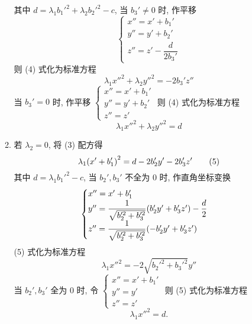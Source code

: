 \begin{enumerate}[label=(\arabic{*})]
\begin{enumerate}[label=(\roman{*})]
                    其中 $d=\lambda_1b_1'^2+\lambda_2b_2'^2-c$, 当 $b_3'\neq0$ 时, 作平移 $$\begin{cases}
                            x''=x'+b_1' \\
                            y''=y'+b_2' \\
                            z''=z'-\dfrac{d}{2b_3'}
                        \end{cases}$$ 则 (4) 式化为标准方程 $$\lambda_1x''^2+\lambda_2y''^2=-2b_3'z''$$
                    当 $b_3'=0$ 时, 作平移 $\begin{cases}
                            x''=x'+b_1' \\
                            y''=y'+b_2' \\
                            z''=z'
                        \end{cases}$ 则 (4) 式化为标准方程 $$\lambda_1x''^2+\lambda_2y''^2=d$$
              \item 若 $\lambda_2=0$, 将 (3) 配方得
                    \begin{equation*}
                        \lambda_1\qty(x'+b_1')^2=d-2b_2'y'-2b_3'z'
                        \tag{5}
                    \end{equation*}
                    其中 $d=\lambda_1b_1'^2-c$, 当 $b_2',b_3'$ 不全为 0 时, 作直角坐标变换
                    $$\begin{cases}
                            x''=x'+b_1'                                                         \\
                            y''=\dfrac{1}{\sqrt{b_2'^2+b_3'^2}}\qty(b_2'y'+b_3'z')-\dfrac{d}{2} \\[6pt]
                            z''=\dfrac{1}{\sqrt{b_2'^2+b_3'^2}}\qty(-b_2'y'+b_3'z')
                        \end{cases}$$
                    (5) 式化为标准方程 $$\lambda_1x''^2=-2\sqrt{b_2'^2+b_3'^2}y''$$
                    当 $b_2',b_3'$ 全为 0 时, 令 $\begin{cases}
                            x''=x'+b_1' \\
                            y''=y'      \\
                            z''=z'
                        \end{cases}$ 则 (5) 式化为标准方程 $$\lambda_1x''^2=d.$$
          \end{enumerate}
\end{enumerate}

